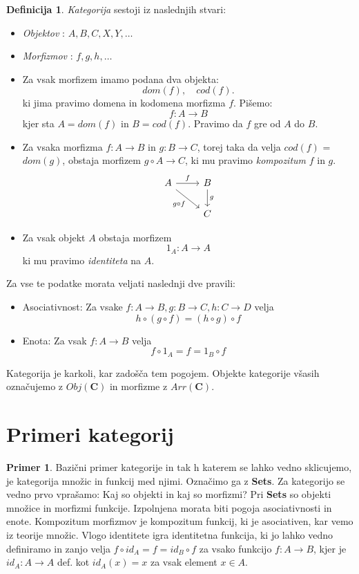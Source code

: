 \documentclass[12pt,a4paper]{book}
\theoremstyle{definition}
\newtheorem{definicija}{Definicija}[chapter]
\theoremstyle{plain}
\theoremstyle{definition}
\newtheorem{primer}{Primer}[section]
\theoremstyle{remark}
\newcommand{\cat}[1]{\textbf{#1}}
\begin{document}
\begin{definicija}
\emph{Kategorija} sestoji iz naslednjih stvari:
\begin{itemize}
\item \emph{Objektov} : $A,B,C,X,Y,\ldots$
\item \emph{Morfizmov} : $f,g,h,\ldots$
\item Za vsak morfizem imamo podana dva objekta: $$dom(f), \quad cod(f).$$
ki jima pravimo domena in kodomena morfizma $f$. Pišemo:
$$f\colon A \to B$$
kjer sta $A = dom(f)$ in $B = cod(f)$.
Pravimo da $f$ gre od $A$ do $B$.
\item Za vsaka morfizma $f \colon A \to B$ in $g \colon B \to C$, torej taka da velja $cod(f)$ = $dom(g)$, obstaja morfizem $g\circ A \to C$, ki mu pravimo \emph{kompozitum} $f$ in $g$.
%
\[
\begin{tikzcd}
A \arrow[r, "f"] \arrow[rd, "g \circ f"']  & B  \arrow[d, "g"] \\
				& C
\end{tikzcd}
\] 
%
\item Za vsak objekt $A$ obstaja morfizem
$$1_A : A \to A$$
ki mu pravimo \emph{identiteta} na $A$.		
\end{itemize}
Za vse te podatke morata veljati naslednji dve pravili:
\begin{itemize}
\item Asociativnost: Za vsake $f : A \to B, g : B \to C, h : C \to D$ velja
$$h \circ (g \circ f) = (h \circ g) \circ f$$
\item Enota: Za vsak $f : A \to B$ velja
$$f \circ 1_A = f = 1_B \circ f$$
\end{itemize}
\end{definicija}
%
Kategorija je karkoli, kar zadošča tem pogojem.
Objekte kategorije všasih označujemo z $Obj(\cat{C})$ in morfizme z $Arr(\cat{C})$.

\section{Primeri kategorij}

\begin{primer}
Bazični primer kategorije in tak h katerem se lahko vedno sklicujemo, je kategorija množic in funkcij med njimi. Označimo ga z \cat{Sets}. Za kategorijo se vedno prvo vprašamo: Kaj so objekti in kaj so morfizmi? Pri \textbf{Sets} so objekti množice in morfizmi funkcije.
Izpolnjena morata biti pogoja asociativnosti in enote.
Kompozitum morfizmov je kompozitum funkcij, ki je asociativen, kar vemo iz teorije množic.
Vlogo identitete igra identitetna funkcija, ki jo lahko vedno definiramo in zanjo velja $f \circ id_A = f = id_B \circ f$ za vsako funkcijo $f : A \to B$, kjer je $id_A : A \to A$ def. kot $id_A(x) = x$ za vsak element $x \in A$.
\end{primer}
\end{document}
